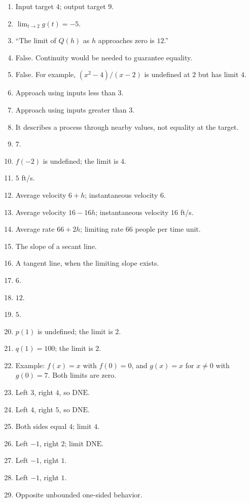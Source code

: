 \documentclass[11pt,openany]{book}
\theoremstyle{bgplain}
\newcommand{\DNE}{\mathrm{DNE}}
\begin{document}
\begin{enumerate}[label=\textbf{1.\arabic*}]
  \item Input target \(4\); output target \(9\).
  \item \(\lim_{t\to2}g(t)=-5\).
  \item ``The limit of \(Q(h)\) as \(h\) approaches zero is \(12\).''
  \item False. Continuity would be needed to guarantee equality.
  \item False. For example, \((x^2-4)/(x-2)\) is undefined at \(2\) but has limit \(4\).
  \item Approach using inputs less than \(3\).
  \item Approach using inputs greater than \(3\).
  \item It describes a process through nearby values, not equality at the target.
  \item \(7\).
  \item \(f(-2)\) is undefined; the limit is \(4\).
  \item \(5\) ft/s.
  \item Average velocity \(6+h\); instantaneous velocity \(6\).
  \item Average velocity \(16-16h\); instantaneous velocity \(16\) ft/s.
  \item Average rate \(66+2h\); limiting rate \(66\) people per time unit.
  \item The slope of a secant line.
  \item A tangent line, when the limiting slope exists.
  \item \(6\).
  \item \(12\).
  \item \(5\).
  \item \(p(1)\) is undefined; the limit is \(2\).
  \item \(q(1)=100\); the limit is \(2\).
  \item Example: \(f(x)=x\) with \(f(0)=0\), and \(g(x)=x\) for \(x\ne0\) with \(g(0)=7\). Both limits are zero.
  \item Left \(3\), right \(4\), so \(\DNE\).
  \item Left \(4\), right \(5\), so \(\DNE\).
  \item Both sides equal \(4\); limit \(4\).
  \item Left \(-1\), right \(2\); limit \(\DNE\).
  \item Left \(-1\), right \(1\).
  \item Left \(-1\), right \(1\).
  \item Opposite unbounded one-sided behavior.

\end{enumerate}
\end{document}
